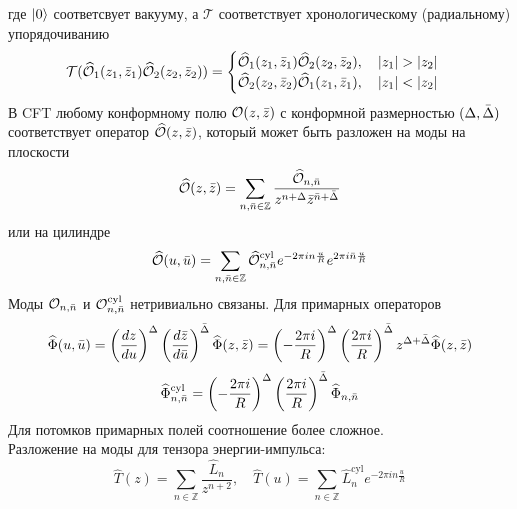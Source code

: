 \documentclass[12pt]{article}
\theoremstyle{definition}
\begin{document}
где $\ket{0}$ соответсвует вакууму, а $\mathcal{T}$ соответствует хронологическому (радиальному) упорядочиванию
\begin{equation}
    \mathcal{T}(\widehat{\mathcal{O}}_1(z_1,\Bar{z}_1)\widehat{\mathcal{O}}_2(z_2,\Bar{z}_2))=\begin{cases}
        \widehat{\mathcal{O}}_1(z_1,\Bar{z}_1)\widehat{\mathcal{O}}_2(z_2,\Bar{z}_2),\quad|z_1|>|z_2|\\
        \widehat{\mathcal{O}}_2(z_2,\Bar{z}_2)\widehat{\mathcal{O}}_1(z_1,\Bar{z}_1),\quad|z_1|<|z_2|
    \end{cases}
\end{equation}
В CFT любому конформному полю $\mathcal{O}(z,\Bar{z})$ с конформной размерностью $(\Delta,\Bar{\Delta})$ соответствует оператор $\widehat{\mathcal{O}}(z,\Bar{z})$, который может быть разложен на моды на плоскости
\begin{equation}
    \widehat{\mathcal{O}}(z,\Bar{z})=\sum\limits_{n,\Bar{n}\in\mathbb{Z}}\frac{\widehat{\mathcal{O}}_{n,\Bar{n}}}{z^{n+\Delta}\Bar{z}^{\Bar{n}+\Bar{\Delta}}}
\end{equation}
или на цилиндре
\begin{equation}
    \widehat{\mathcal{O}}(u,\Bar{u})=\sum\limits_{n,\Bar{n}\in\mathbb{Z}}\widehat{\mathcal{O}}^{\text{cyl}}_{n,\Bar{n}}e^{-2\pi in\frac{u}{R}}e^{2\pi i\Bar{n}\frac{u}{R}}
\end{equation}
Моды $\mathcal{O}_{n,\Bar{n}}$ и $\mathcal{O}^{\text{cyl}}_{n,\Bar{n}}$ нетривиально связаны. Для примарных операторов
\begin{equation}
    \widehat{\Phi}(u,\Bar{u})=\left(\frac{dz}{du}\right)^\Delta\left(\frac{d\Bar{z}}{d\Bar{u}}\right)^{\Bar{\Delta}}\widehat{\Phi}(z,\Bar{z})=\left(-\frac{2\pi i}{R}\right)^\Delta\left(\frac{2\pi i}{R}\right)^{\bar{\Delta}}z^{\Delta+\Bar{\Delta}}\widehat{\Phi}(z,\Bar{z})
\end{equation}
\begin{equation}
    \widehat{\Phi}^{\text{cyl}}_{n,\Bar{n}}=\left(-\frac{2\pi i}{R}\right)^\Delta\left(\frac{2\pi i}{R}\right)^{\bar{\Delta}}\widehat{\Phi}_{n,\Bar{n}}
\end{equation}
Для потомков примарных полей соотношение более сложное.\\
Разложение на моды для тензора энергии-импульса:
\begin{equation}
    \widehat{T}(z)=\sum\limits_{n\in\mathbb{Z}}\frac{\widehat{L}_n}{z^{n+2}},\quad \widehat{T}(u)=\sum\limits_{n\in\mathbb{Z}}\widehat{L}^{\text{cyl}}_{n}e^{-2\pi in\frac{u}{R}}
\end{equation}
\end{document}
